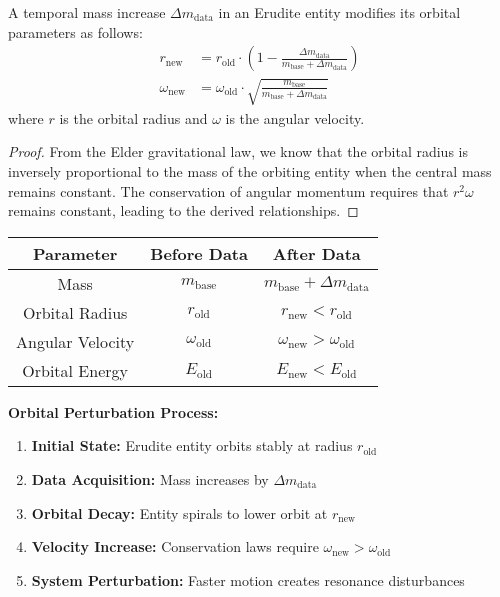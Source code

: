 \begin{theorem}
A temporal mass increase $\Delta m_{\text{data}}$ in an Erudite entity modifies its orbital parameters as follows:
\begin{align}
r_{\text{new}} &= r_{\text{old}} \cdot \left(1 - \frac{\Delta m_{\text{data}}}{m_{\text{base}} + \Delta m_{\text{data}}}\right) \\
\omega_{\text{new}} &= \omega_{\text{old}} \cdot \sqrt{\frac{m_{\text{base}}}{m_{\text{base}} + \Delta m_{\text{data}}}}
\end{align}
where $r$ is the orbital radius and $\omega$ is the angular velocity.
\end{theorem}

\begin{proof}
From the Elder gravitational law, we know that the orbital radius is inversely proportional to the mass of the orbiting entity when the central mass remains constant. The conservation of angular momentum requires that $r^2\omega$ remains constant, leading to the derived relationships.
\end{proof}

\begin{center}
\begin{tabular}{|c|c|c|}
\hline
\textbf{Parameter} & \textbf{Before Data} & \textbf{After Data} \\
\hline
Mass & $m_{\text{base}}$ & $m_{\text{base}} + \Delta m_{\text{data}}$ \\
\hline
Orbital Radius & $r_{\text{old}}$ & $r_{\text{new}} < r_{\text{old}}$ \\
\hline
Angular Velocity & $\omega_{\text{old}}$ & $\omega_{\text{new}} > \omega_{\text{old}}$ \\
\hline
Orbital Energy & $E_{\text{old}}$ & $E_{\text{new}} < E_{\text{old}}$ \\
\hline
\end{tabular}
\end{center}

\textbf{Orbital Perturbation Process:}
\begin{enumerate}
\item \textbf{Initial State:} Erudite entity orbits stably at radius $r_{\text{old}}$
\item \textbf{Data Acquisition:} Mass increases by $\Delta m_{\text{data}}$
\item \textbf{Orbital Decay:} Entity spirals to lower orbit at $r_{\text{new}}$
\item \textbf{Velocity Increase:} Conservation laws require $\omega_{\text{new}} > \omega_{\text{old}}$
\item \textbf{System Perturbation:} Faster motion creates resonance disturbances
\end{enumerate}

